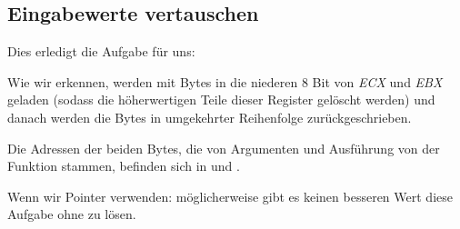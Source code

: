 \subsection{Eingabewerte vertauschen}

Dies erledigt die Aufgabe für uns:

Wie wir erkennen, werden mit  Bytes in die niederen 8 Bit von \emph{ECX} und \emph{EBX} geladen (sodass die
höherwertigen Teile dieser Register gelöscht werden) und danach werden die Bytes in umgekehrter Reihenfolge
zurückgeschrieben.


Die Adressen der beiden Bytes, die von Argumenten und Ausführung von der Funktion stammen, befinden sich in  und
. 

Wenn wir Pointer verwenden: möglicherweise gibt es keinen besseren Wert diese Aufgabe ohne zu lösen.
